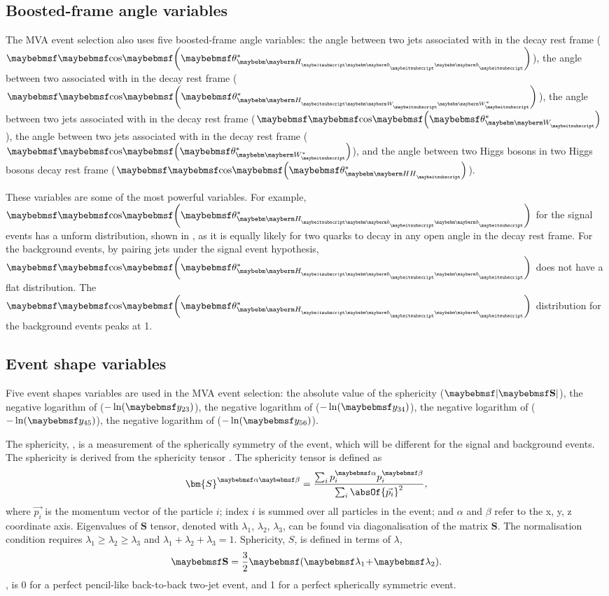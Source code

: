 \subsection{Boosted-frame angle variables}

The MVA event selection also uses five boosted-frame angle variables: the angle between two jets associated with \Hbb in the \Hbb decay rest frame ($\cosStar{\Hbb}$), the angle between two \PW associated with \HWW in the \HWW decay rest frame ($\cosStar{\HWW}$), the angle between two jets associated with \PW in the \PW decay rest frame ($\cosStar{\PW}$), the angle between two jets associated with \W* in the \W* decay rest frame ($\cosStar{\W*}$), and the angle between two Higgs bosons in two Higgs bosons decay rest frame ($\cosStar{\HH}$).

These variables are some of the most powerful variables. For example, $\cosStar{\Hbb}$ for  the signal events has a unform distribution, shown in , as it is equally likely for two quarks to decay in any open angle in the \Hbb decay rest frame. For the background events, by pairing jets under the signal event hypothesis, $\cosStar{\Hbb}$ does not have a flat distribution. The  $\cosStar{\Hbb}$ distribution for the background events peaks at 1.

\subsection{Event shape variables}

Five event shapes variables are used in the MVA event selection: the absolute value of the sphericity ($\abs{\sphericity}$), the negative logarithm of  ($-\ln(\y{23})$), the negative logarithm of  ($-\ln(\y{34})$), the negative logarithm of  ($-\ln(\y{45})$), the negative logarithm of  ($-\ln(\y{56})$).

The sphericity, \sphericity, is a measurement of the spherically symmetry of the event, which will be different for the signal and background events. The sphericity is  derived from the sphericity tensor \cite{PhysRevLett.35.1609}. The sphericity tensor is  defined as
\begin{equation}
{\bm{S}^{\alpha\beta}} = \frac{\sum_{i}p^{\alpha}_{i}p^{\beta}_{i}}{\sum_{i}\absOf{\vec{p_{i}}}^2},
\end{equation}
where $\vec{p_{i}}$ is the momentum vector of the particle $i$; index $i$ is summed over all particles in the event; and $\alpha$ and $\beta$ refer to the x, y, z coordinate axis. Eigenvalues of $\bm{S}$  tensor, denoted with $\lambda_{1}$, $\lambda_{2}$, $\lambda_{3}$, can be found via diagonalisation of the matrix $\bm{S}$. The normalisation condition requires $\lambda_{1}\!\geqslant\! \lambda_{2} \! \geqslant \! \lambda_{3}$ and $ \lambda_{1} \! + \! \lambda_{2} \! + \! \lambda_{3} \! = \! 1 $. Sphericity, $S$, is defined in terms of $\lambda$,
\begin{equation}
\sphericity = \frac{3}{2}\parenths{\lambda_{1} \! + \! \lambda_{2}}.
\end{equation}
\sphericity, is 0 for a perfect pencil-like back-to-back two-jet event, and 1 for a perfect spherically symmetric event.

